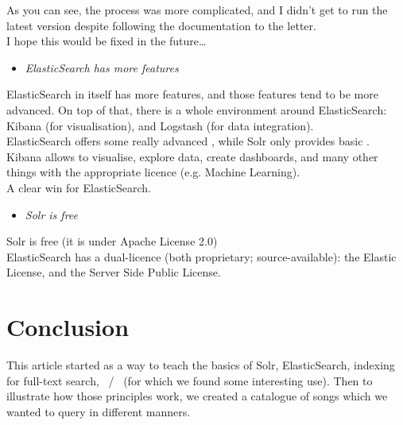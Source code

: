 As you can see, the process was more complicated, and I didn't get to run the latest version despite following the documentation to the letter. \\

I hope this would be fixed in the future\dots \\


\bigskip


\begin{itemize}
	\item \emph{ElasticSearch has more features} 
\end{itemize}

ElasticSearch in itself has more features, and those features tend to be more advanced. On top of that, there is a whole environment around ElasticSearch: Kibana (for visualisation), and Logstash (for data integration). \\

ElasticSearch offers some really advanced \aggregations, while Solr only provides basic \faceting. \\

Kibana allows to visualise, explore data, create dashboards, and many other things with the appropriate licence (e.g. Machine Learning). \\

A clear win for ElasticSearch. \\

\bigskip
\bigskip

\begin{itemize}
	\item \emph{Solr is free}
\end{itemize}

Solr is free (it is under Apache License 2.0) \\

ElasticSearch has a dual-licence (both proprietary; source-available): the Elastic License, and the Server Side Public License. \\





\section{Conclusion}

This article started as a way to teach the basics of Solr, ElasticSearch, indexing for full-text search, \faceting\ / \aggregations\ (for which we found some interesting use). Then to illustrate how those principles work, we created a catalogue of songs which we wanted to query in different manners. \\

